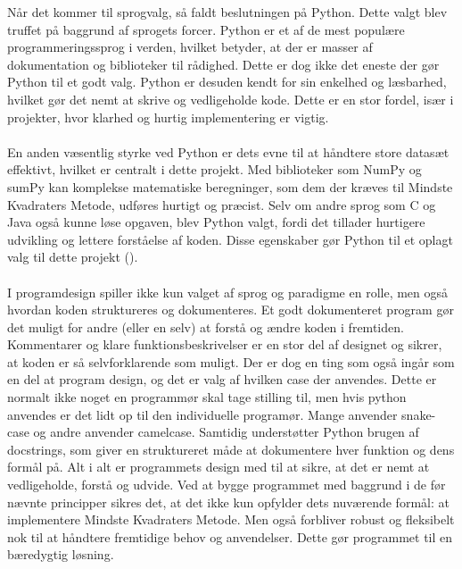 Når det kommer til sprogvalg, så faldt beslutningen på Python. Dette valgt blev truffet på baggrund af sprogets forcer. Python er et af de mest populære programmeringssprog i verden, hvilket betyder, at der er masser af dokumentation og biblioteker til rådighed. Dette er dog ikke det eneste der gør Python til et godt valg. Python er desuden kendt for sin enkelhed og læsbarhed, hvilket gør det nemt at skrive og vedligeholde kode. Dette er en stor fordel, især i projekter, hvor klarhed og hurtig implementering er vigtig. \\\\
En anden væsentlig styrke ved Python er dets evne til at håndtere store datasæt effektivt, hvilket er centralt i dette projekt. Med biblioteker som NumPy og sumPy kan komplekse matematiske beregninger, som dem der kræves til Mindste Kvadraters Metode, udføres hurtigt og præcist. Selv om andre sprog som C og Java også kunne løse opgaven, blev Python valgt, fordi det tillader hurtigere udvikling og lettere forståelse af koden. Disse egenskaber gør Python til et oplagt valg til dette projekt (\cite{simplilearn}). \\\\
I programdesign spiller ikke kun valget af sprog og paradigme en rolle, men også hvordan koden struktureres og dokumenteres. Et godt dokumenteret program gør det muligt for andre (eller en selv) at forstå og ændre koden i fremtiden. Kommentarer og klare funktionsbeskrivelser er en stor del af designet og sikrer, at koden er så selvforklarende som muligt. Der er dog en ting som også ingår som en del at program design, og det er valg af hvilken case der anvendes. Dette er normalt ikke noget en programmør skal tage stilling til, men hvis python anvendes er det lidt op til den individuelle programør. Mange anvender snake-case og andre anvender camelcase. Samtidig understøtter Python brugen af docstrings, som giver en struktureret måde at dokumentere hver funktion og dens formål på.
Alt i alt er programmets design med til at sikre, at det er nemt at vedligeholde, forstå og udvide. Ved at bygge programmet med baggrund i de før nævnte principper sikres det, at det ikke kun opfylder dets nuværende formål: at implementere Mindste Kvadraters Metode. Men også forbliver robust og fleksibelt nok til at håndtere fremtidige behov og anvendelser. Dette gør programmet til en bæredygtig løsning.

